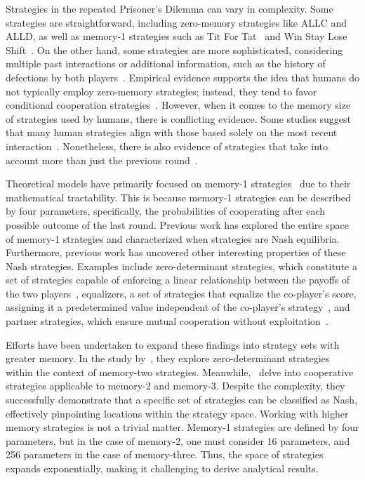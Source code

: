 \documentclass{article}
\theoremstyle{definition}
\begin{document}
Strategies in the repeated Prisoner's Dilemma can vary in complexity. Some
strategies are straightforward, including zero-memory strategies like ALLC and
ALLD, as well as memory-1 strategies such as Tit For
Tat~\cite{axelrod:AAAS:1981} and Win Stay Lose Shift~\cite{nowak:Nature:1993}.
On the other hand, some strategies are more sophisticated, considering multiple
past interactions or additional information, such as the history of defections
by both players~\cite{harper:PLOSONE:2017, knight:PLOSONE:2018,
li:NatureCompSci:2022}.
Empirical evidence supports the idea that humans do not typically employ
zero-memory strategies; instead, they tend to favor conditional cooperation
strategies~\cite{fischbacher:AER:2010, rand:Elsevier:2013,
grujic:ScientificReports:2014}. However, when it comes to the memory size of strategies used
by humans, there is conflicting evidence. Some studies suggest that many human
strategies align with those based solely on the most recent
interaction~\cite{engle:ET:2006, dal:AER:2011, camera:GEB:2012, bruttel:TD:2012}.
Nonetheless, there is also evidence of strategies that
take into account more than just the previous round~\cite{fudenberg:AER:2012}.

Theoretical models have primarily focused on memory-1
strategies~\cite{nowak:Nature:1993, nowak:Nature:1992, glynatsi:scientific:2020, press:PNAS:2012,
stewart:scientific:2016, kraines:elsevier:2000,
imhof:ProceedingsB:2010, baek:scientific:2016, hilbe:PNAS:2013,
chen:PNASnexus:2023, hilbe:Nature:2018, akin:EGADS:2016} due to their
mathematical tractability. This is because memory-1 strategies can be described
by four parameters, specifically, the probabilities of cooperating after each
possible outcome of the last round. Previous work has explored the entire space
of memory-1 strategies and characterized when strategies are Nash equilibria.
Furthermore, previous work has uncovered other interesting properties of these
Nash strategies. Examples include zero-determinant strategies, which constitute
a set of strategies capable of enforcing a linear relationship between the
payoffs of the two players~\cite{press:PNAS:2012}, equalizers, a set of
strategies that equalize the co-player's score, assigning it a predetermined
value independent of the co-player's strategy~\cite{hilbe:PNAS:2013}, and
partner strategies, which ensure mutual cooperation without
exploitation~\cite{hilbe:Nature:2018}.

Efforts have been undertaken to expand these findings into strategy sets with
greater memory. In the study by~\cite{ueda:RSOP:2021}, they explore
zero-determinant strategies within the context of
memory-two strategies. Meanwhile,~\cite{hilbe:PNAS:2017} delve into cooperative
strategies applicable to memory-2 and memory-3. Despite the complexity, they
successfully demonstrate that a specific set of strategies can be classified as
Nash, effectively pinpointing locations within the strategy space.
Working with higher memory strategies is not a trivial matter. Memory-1
strategies are defined by four parameters, but in the case of memory-2, one must
consider 16 parameters, and 256 parameters in the case of memory-three. Thus, the
space of strategies expands exponentially, making it challenging to derive
analytical results.
\end{document}
